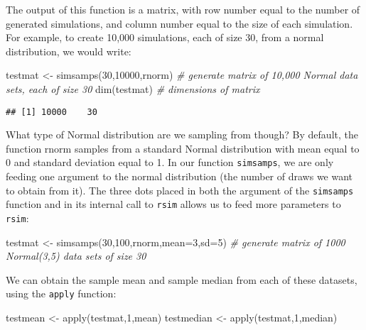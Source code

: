 \documentclass[
]{book}
\newenvironment{Shaded}{\begin{snugshade}}{\end{snugshade}}
\newcommand{\AttributeTok}[1]{\textcolor[rgb]{0.77,0.63,0.00}{#1}}
\newcommand{\CommentTok}[1]{\textcolor[rgb]{0.56,0.35,0.01}{\textit{#1}}}
\newcommand{\DecValTok}[1]{\textcolor[rgb]{0.00,0.00,0.81}{#1}}
\newcommand{\FunctionTok}[1]{\textcolor[rgb]{0.00,0.00,0.00}{#1}}
\newcommand{\NormalTok}[1]{#1}
\newcommand{\OtherTok}[1]{\textcolor[rgb]{0.56,0.35,0.01}{#1}}
\begin{document}
The output of this function is a matrix, with row number equal to the number of generated simulations, and column number equal to the size of each simulation. For example, to create 10,000 simulations, each of size 30, from a normal distribution, we would write:

\begin{Shaded}
\begin{Highlighting}[]
\NormalTok{testmat }\OtherTok{\textless{}{-}} \FunctionTok{simsamps}\NormalTok{(}\DecValTok{30}\NormalTok{,}\DecValTok{10000}\NormalTok{,rnorm) }\CommentTok{\# generate matrix of 10,000 Normal data sets, each of size 30}
\FunctionTok{dim}\NormalTok{(testmat) }\CommentTok{\# dimensions of matrix}
\end{Highlighting}
\end{Shaded}

\begin{verbatim}
## [1] 10000    30
\end{verbatim}

What type of Normal distribution are we sampling from though? By default, the function rnorm samples from a standard Normal distribution with mean equal to 0 and standard deviation equal to 1. In our function \texttt{simsamps}, we are only feeding one argument to the normal distribution (the number of draws we want to obtain from it). The three dots placed in both the argument of the \texttt{simsamps} function and in its internal call to \texttt{rsim} allows us to feed more parameters to \texttt{rsim}:

\begin{Shaded}
\begin{Highlighting}[]
\NormalTok{testmat }\OtherTok{\textless{}{-}} \FunctionTok{simsamps}\NormalTok{(}\DecValTok{30}\NormalTok{,}\DecValTok{100}\NormalTok{,rnorm,}\AttributeTok{mean=}\DecValTok{3}\NormalTok{,}\AttributeTok{sd=}\DecValTok{5}\NormalTok{) }\CommentTok{\# generate matrix of 1000 Normal(3,5) data sets of size 30}
\end{Highlighting}
\end{Shaded}

We can obtain the sample mean and sample median from each of these datasets, using the \texttt{apply} function:

\begin{Shaded}
\begin{Highlighting}[]
\NormalTok{testmean }\OtherTok{\textless{}{-}} \FunctionTok{apply}\NormalTok{(testmat,}\DecValTok{1}\NormalTok{,mean)}
\NormalTok{testmedian }\OtherTok{\textless{}{-}} \FunctionTok{apply}\NormalTok{(testmat,}\DecValTok{1}\NormalTok{,median)}
\end{Highlighting}
\end{Shaded}
\end{document}
